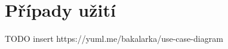 \section{Případy užití}
\label{sc:use_cases}






















TODO insert
https://yuml.me/bakalarka/use-case-diagram
